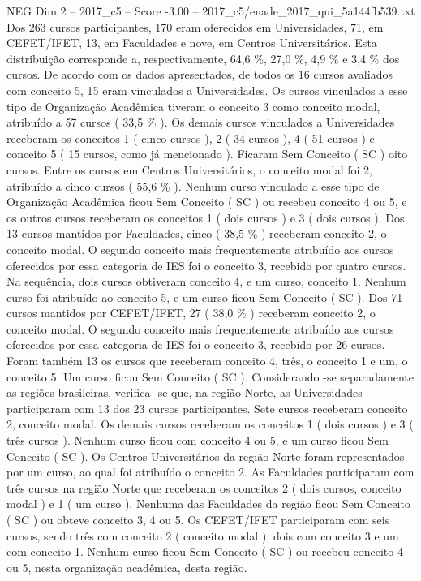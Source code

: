\begin{textsample}{NEG Dim 2 – 2017\_c5 – Score -3.00 – 2017\_c5/enade\_2017\_qui\_5a144fb539.txt}
Dos 263 cursos participantes, 170 eram oferecidos em Universidades, 71, em CEFET/IFET, 13, em Faculdades e nove, em Centros Universitários.
Esta distribuição corresponde a, respectivamente, 64,6 \%, 27,0 \%, 4,9 \% e 3,4 \% dos cursos.
De acordo com os dados apresentados, de todos os 16 cursos avaliados com conceito 5, 15 eram vinculados a Universidades.
Os cursos vinculados a esse tipo de Organização Acadêmica tiveram o conceito 3 como conceito modal, atribuído a 57 cursos ( 33,5 \% ).
Os demais cursos vinculados a Universidades receberam os conceitos 1 ( cinco cursos ), 2 ( 34 cursos ), 4 ( 51 cursos ) e conceito 5 ( 15 cursos, como já mencionado ).
Ficaram Sem Conceito ( SC ) oito cursos.
Entre os cursos em Centros Universitários, o conceito modal foi 2, atribuído a cinco cursos ( 55,6 \% ).
Nenhum curso vinculado a esse tipo de Organização Acadêmica ficou Sem Conceito ( SC ) ou recebeu conceito 4 ou 5, e os outros cursos receberam os conceitos 1 ( dois cursos ) e 3 ( dois cursos ).
Dos 13 cursos mantidos por Faculdades, cinco ( 38,5 \% ) receberam conceito 2, o conceito modal.
O segundo conceito mais frequentemente atribuído aos cursos oferecidos por essa categoria de IES foi o conceito 3, recebido por quatro cursos.
Na sequência, dois cursos obtiveram conceito 4, e um curso, conceito 1.
Nenhum curso foi atribuído ao conceito 5, e um curso ficou Sem Conceito ( SC ).
Dos 71 cursos mantidos por CEFET/IFET, 27 ( 38,0 \% ) receberam conceito 2, o conceito modal.
O segundo conceito mais frequentemente atribuído aos cursos oferecidos por essa categoria de IES foi o conceito 3, recebido por 26 cursos.
Foram também 13 os cursos que receberam conceito 4, três, o conceito 1 e um, o conceito 5.
Um curso ficou Sem Conceito ( SC ).
Considerando -se separadamente as regiões brasileiras, verifica -se que, na região Norte, as Universidades participaram com 13 dos 23 cursos participantes.
Sete cursos receberam conceito 2, conceito modal.
Os demais cursos receberam os conceitos 1 ( dois cursos ) e 3 ( três cursos ).
Nenhum curso ficou com conceito 4 ou 5, e um curso ficou Sem Conceito ( SC ).
Os Centros Universitários da região Norte foram representados por um curso, ao qual foi atribuído o conceito 2.
As Faculdades participaram com três cursos na região Norte que receberam os conceitos 2 ( dois cursos, conceito modal ) e 1 ( um curso ).
Nenhuma das Faculdades da região ficou Sem Conceito ( SC ) ou obteve conceito 3, 4 ou 5.
Os CEFET/IFET participaram com seis cursos, sendo três com conceito 2 ( conceito modal ), dois com conceito 3 e um com conceito 1.
Nenhum curso ficou Sem Conceito ( SC ) ou recebeu conceito 4 ou 5, nesta organização acadêmica, desta região.

\end{textsample}
